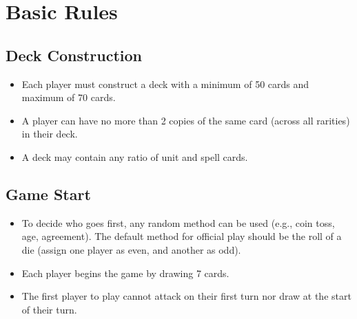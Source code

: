 










\section{Basic Rules}

\subsection{Deck Construction}
\begin{itemize}
    \item Each player must construct a deck with a minimum of 50 cards and maximum of 70 cards.
    \item A player can have no more than 2 copies of the same card (across all rarities) in their deck.
    \item A deck may contain any ratio of unit and spell cards.
\end{itemize}





\subsection{Game Start}
\begin{itemize}
    \item To decide who goes first, any random method can be used (e.g., coin toss, age, agreement). The default method for official play should be the roll of a die (assign one player as even, and another as odd).
    \item Each player begins the game by drawing 7 cards.
    \item The first player to play cannot attack on their first turn nor draw at the start of their turn.
\end{itemize}








